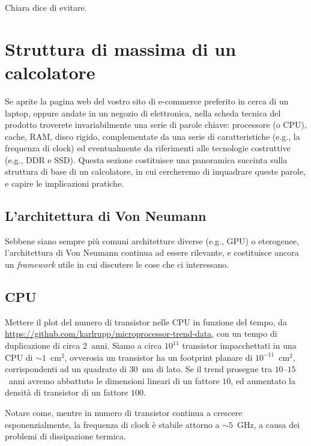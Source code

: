 Chiara dice di evitare.



\section{Struttura di massima di un calcolatore}

Se aprite la pagina web del vostro sito di e-commerce preferito in cerca di un
laptop, oppure andate in un negozio di elettronica, nella scheda tecnica del prodotto
troverete invariabilmente una serie di parole chiave: processore (o CPU), cache,
RAM, disco rigido, complementate da una serie di caratteristiche (e.g., la frequenza
di clock) ed eventualmente da riferimenti alle tecnologie costruttive (e.g., DDR e SSD).
Questa sezione costituisce una panoramica succinta sulla struttura di base di un
calcolatore, in cui cercheremo di inquadrare queste parole, e capire le implicazioni
pratiche.


\subsection{L'architettura di Von Neumann}

Sebbene siano sempre pi\`u comuni architetture diverse (e.g., GPU) o eterogenee,
l'architettura di Von Neumann continua ad essere rilevante, e costituisce ancora
un \emph{framework} utile in cui discutere le cose che ci interessano.

\subsection{CPU}

Mettere il plot del numero di transistor nelle CPU in funzione del tempo, da
\url{https://github.com/karlrupp/microprocessor-trend-data}, con un tempo di duplicazione
di circa 2~anni. Siamo a circa $10^{11}$ transistor impacchettati in una CPU di
$\sim 1$~cm$^2$, ovverosia un transistor ha un footprint planare di $10^{-11}$~cm$^2$,
corrispondenti ad un quadrato di $30$~nm di lato. Se il trend prosegue tra
$10$--$15$~anni avremo abbattuto le dimensioni lineari di un fattore $10$, ed aumentato
la densit\`a di transistor di un fattore $100$.




Notare come, mentre in numero di transistor continua a crescere esponenzialmente,
la frequenza di clock \`e stabile attorno a $\sim 5$~GHz, a causa dei problemi di
dissipazione termica.

